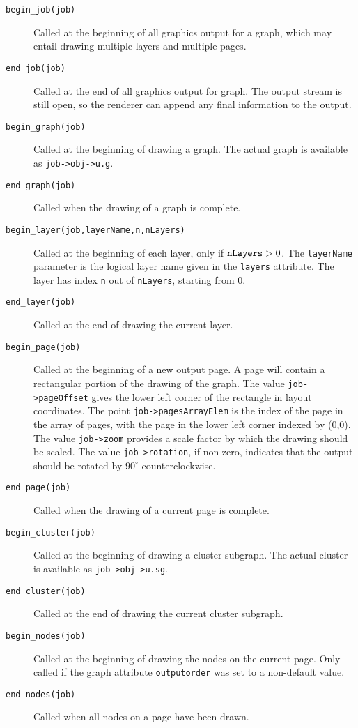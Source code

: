 \begin{description}
\item[{\tt begin\_job(job)}]
Called at the beginning of all graphics output for a graph,
which may entail drawing multiple layers and multiple pages.
\item[{\tt end\_job(job)}]
Called at the end of all graphics output for graph. The output stream
is still open, so the renderer can append any final information
to the output.
\item[{\tt begin\_graph(job)}]
Called at the beginning of drawing a graph.
The actual graph is available as {\tt job->obj->u.g}.
\item[{\tt end\_graph(job)}]
Called when the drawing of a graph is complete.
\item[{\tt begin\_layer(job,layerName,n,nLayers)}]
Called at the beginning of each layer, only if ${\tt nLayers} > 0$.
The {\tt layerName} parameter is the logical layer name given in
the {\tt layers} attribute. The layer has index {\tt n} out of
{\tt nLayers}, starting from 0.
\item[{\tt end\_layer(job)}] 
Called at the end of drawing the current layer.
\item[{\tt begin\_page(job)}] 
Called at the beginning of a new output page.
A page will contain a rectangular portion of the drawing of the graph.
The value {\tt job->pageOffset} gives the lower left corner of the
rectangle in layout coordinates.
The point {\tt job->pagesArrayElem} is the index of the page in the array of 
pages, with the page in the lower left corner indexed by (0,0). 
The value {\tt job->zoom} provides a scale factor by which the drawing should
be scaled. The value {\tt job->rotation}, if non-zero, indicates that the
output should be rotated by $90^{\circ}$ counterclockwise.
\item[{\tt end\_page(job)}] 
Called when the drawing of a current page is complete.
\item[{\tt begin\_cluster(job)}]
Called at the beginning of drawing a cluster subgraph.
The actual cluster is available as {\tt job->obj->u.sg}.
\item[{\tt end\_cluster(job)}]
Called at the end of drawing the current cluster subgraph.
\item[{\tt begin\_nodes(job)}]
Called at the beginning of drawing the nodes on the current page.
Only called if the graph attribute {\tt outputorder} was set to a non-default
value.
\item[{\tt end\_nodes(job)}]
Called when all nodes on a page have been drawn.

\end{description}

